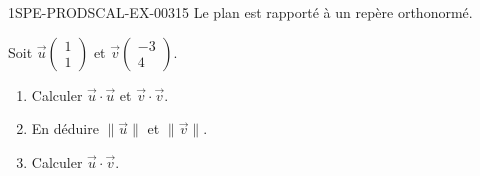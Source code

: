 \begin{exercice}{1SPE-PRODSCAL-EX-003}{1}{5}
Le plan est rapporté à un repère orthonormé.

Soit $\vec{u}\begin{pmatrix} 1 \\ 1 \end{pmatrix}$ et $\vec{v}\begin{pmatrix} -3 \\ 4 \end{pmatrix}$.
\begin{enumerate}
  \item Calculer $\vec{u} \cdot \vec{u}$ et $\vec{v} \cdot \vec{v}$.
  \item En déduire $\|\vec{u}\|$ et $\|\vec{v}\|$.
  \item Calculer $\vec{u} \cdot \vec{v}$.
\end{enumerate}
\end{exercice}
